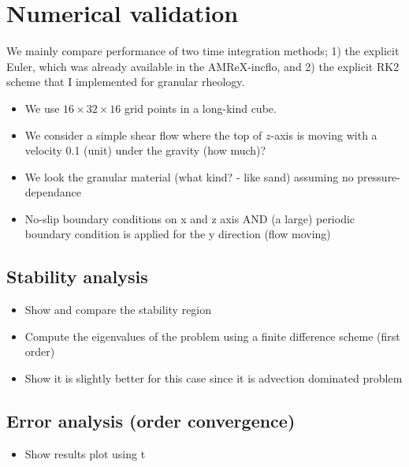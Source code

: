 \section{Numerical validation}
We mainly compare performance of two time integration methods; 1) the explicit Euler, which was already available in the AMReX-incflo, and 2) the explicit RK2 scheme that I implemented for granular rheology.
\begin{itemize}
  \item We use $16 \times 32 \times 16$ grid points in a long-kind cube.
  \item We consider a simple shear flow where the top of $z$-axis is moving with a velocity 0.1 (unit) under the gravity (how much)?  \item We look the granular material (what kind? - like sand) assuming no pressure-dependance
  \item No-slip boundary conditions on x and z axis AND (a large) periodic boundary condition is applied for the y direction (flow moving)
\end{itemize}



\subsection{Stability analysis}
\begin{itemize}
  \item Show and compare the stability region
  \item Compute the eigenvalues of the problem using a finite difference scheme (first order)
  \item Show it is slightly better for this case since it is advection dominated problem
\end{itemize}
\subsection{Error analysis (order convergence)}
\begin{itemize}
  \item Show results plot using t 
\end{itemize}

